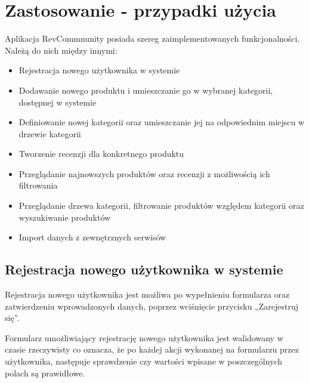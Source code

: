 \chapter{Zastosowanie - przypadki użycia}

Aplikacja RevCommnunity posiada szereg zaimplementowanych funkcjonalności. Należą do nich między innymi:

\begin{itemize}
\item Rejestracja nowego użytkownika w systemie
\item Dodawanie nowego produktu i umieszczanie go w wybranej kategorii, dostępnej w systemie
\item Definiowanie nowej kategorii oraz umieszczanie jej na odpowiednim miejscu w drzewie kategorii
\item Tworzenie recenzji dla konkretnego produktu
\item Przeglądanie najnowszych produktów oraz recenzji z możliwością ich filtrowania
\item Przeglądanie drzewa kategorii, filtrowanie produktów względem kategorii oraz wyszukiwanie produktów
\item Import danych z zewnętrznych serwisów
\end{itemize}

\section{Rejestracja nowego użytkownika w systemie}

Rejestracja nowego użytkownika jest możliwa po wypełnieniu formularza oraz zatwierdzeniu wprowadzonych danych, poprzez wciśnięcie przycisku „Zarejestruj się”.

Formularz umożliwiający rejestrację nowego użytkownika jest walidowany w czasie rzeczywisty co oznacza, że po każdej akcji wykonanej na formularzu przez użytkownika, następuje sprawdzenie czy wartości wpisane w poszczególnych polach są prawidłowe.

